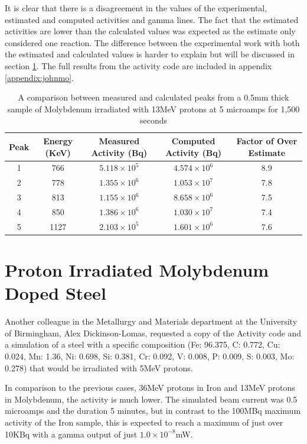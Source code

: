 It is clear that there is a disagreement in the values of the experimental, estimated and computed activities and gamma lines.  The fact that the estimated activities are lower than the calculated values was expected as the estimate only considered one reaction.  The difference between the experimental work with both the estimated and calculated values is harder to explain but will be discussed in section \ref{}.  The full results from the activity code are included in appendix \ref{appendix:johnmo}.


\begin{table}[h]
\begin{center}
\begin{tabular}{c c c c c}
\hline\hline
Peak & Energy (KeV) & Measured Activity (Bq) & Computed Activity (Bq) & Factor of Over Estimate\\
\hline\hline
1 & 766 & $5.118 \times 10^{5}$ & $4.574 \times 10^{6}$ & 8.9\\
2 & 778 & $1.355 \times 10^{6}$ & $1.053 \times 10^{7}$ & 7.8\\
3 & 813 & $1.155 \times 10^{6}$ & $8.658 \times 10^{6}$ & 7.5\\
4 & 850 & $1.386 \times 10^{6}$ & $1.030 \times 10^{7}$ & 7.4 \\
5 & 1127 & $2.103 \times 10^{5}$ & $1.601 \times 10^{6}$ & 7.6 \\
\hline\hline
\end{tabular}
\end{center}
\caption{A comparison between measured and calculated peaks from a 0.5mm thick sample of Molybdenum irradiated with 13MeV protons at 5 microamps for 1,500 seconds}
\label{table:johnhewettresultsvcalculated}
\end{table}





\FloatBarrier
\section{Proton Irradiated Molybdenum Doped Steel}

Another colleague in the Metallurgy and Materials department at the University of Birmingham, Alex Dickinson-Lomas,  requested a copy of the Activity code and a simulation of a steel with a specific composition (Fe: 96.375, C: 0.772, Cu: 0.024, Mn: 1.36, Ni: 0.698, Si: 0.381, Cr: 0.092, V: 0.008, P: 0.009, S: 0.003, Mo: 0.278) that would be irradiated with 5MeV protons.

In comparison to the previous cases, 36MeV protons in Iron and 13MeV protons in Molybdenum, the activity is much lower.  The simulated beam current was 0.5 microamps and the duration 5 minutes, but in contrast to the 100MBq maximum activity of the Iron sample, this is expected to reach a maximum of just over 10KBq with a gamma output of just $1.0 \times 10^{-8}$mW.

